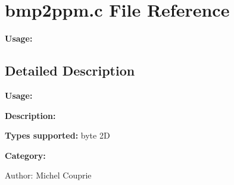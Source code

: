 \section{bmp2ppm.c File Reference}
\label{bmp2ppm_8c}
{\bf Usage:}  




\label{_details}
\subsection{Detailed Description}
{\bf Usage:} 

{\bf Description:}

{\bf Types supported:} byte 2D

{\bf Category:}

\begin{Desc}
\item[Author:]Michel Couprie \end{Desc}
